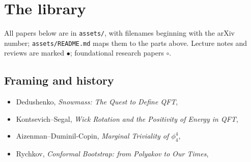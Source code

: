 \newpage

{}
\section*{The library}

\noin All papers below are in \texttt{assets/}, with filenames beginning with the arXiv number; \texttt{assets/README.md} maps them to the parts above. Lecture notes and reviews are marked $\bullet$; foundational research papers $\circ$.

\subsection*{Framing and history}
\begin{itemize}
\item[$\bullet$] Dedushenko, \emph{Snowmass: The Quest to Define QFT}, 
\item[$\circ$] Kontsevich--Segal, \emph{Wick Rotation and the Positivity of Energy in QFT}, 
\item[$\circ$] Aizenman--Duminil-Copin, \emph{Marginal Triviality of $\phi^4_4$}, 
\item[$\bullet$] Rychkov, \emph{Conformal Bootstrap: from Polyakov to Our Times}, 
\end{itemize}

